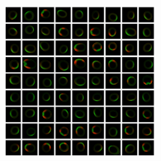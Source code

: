 \documentclass{pnastwo}
\begin{document}
\begin{figure}
\includegraphics[width=0.5\textwidth]{unregistered_unordered_2d}
\caption{}
\label{fig:fluorescent_images}
\end{figure}
\end{document}
